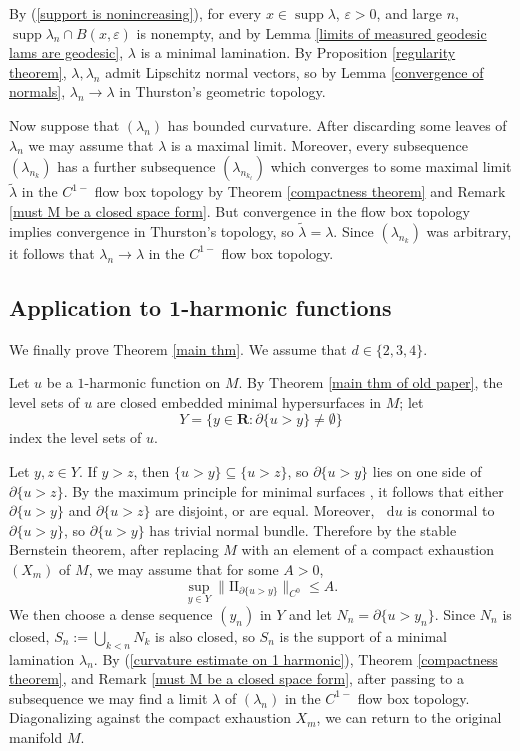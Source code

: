 \documentclass[reqno,11pt]{amsart}
\newcommand{\RR}{\mathbf{R}}
\newcommand*\dif{\mathop{}\!\mathrm{d}}
\DeclareMathOperator{\supp}{supp}
\newcommand{\Two}{\mathrm{I\!I}}
\theoremstyle{definition}
\numberwithin{equation}{section}
\begin{document}
By (\ref{support is nonincreasing}), for every $x \in \supp \lambda$, $\varepsilon > 0$, and large $n$, $\supp \lambda_n \cap B(x, \varepsilon)$ is nonempty, and by Lemma \ref{limits of measured geodesic lams are geodesic}, $\lambda$ is a minimal lamination.
By Proposition \ref{regularity theorem}, $\lambda, \lambda_n$ admit Lipschitz normal vectors, so by Lemma \ref{convergence of normals}, $\lambda_n \to \lambda$ in Thurston's geometric topology.

Now suppose that $(\lambda_n)$ has bounded curvature.
After discarding some leaves of $\lambda_n$ we may assume that $\lambda$ is a maximal limit.
Moreover, every subsequence $(\lambda_{n_k})$ has a further subsequence $(\lambda_{n_{k_\ell}})$ which converges to some maximal limit $\tilde \lambda$ in the $C^{1-}$ flow box topology by Theorem \ref{compactness theorem} and Remark \ref{must M be a closed space form}.
But convergence in the flow box topology implies convergence in Thurston's topology, so $\tilde \lambda = \lambda$.
Since $(\lambda_{n_k})$ was arbitrary, it follows that $\lambda_n \to \lambda$ in the $C^{1-}$ flow box topology.


\subsection{Application to 1-harmonic functions}
We finally prove Theorem \ref{main thm}.
We assume that $d \in \{2, 3, 4\}$.

Let $u$ be a $1$-harmonic function on $M$.
By Theorem \ref{main thm of old paper}, the level sets of $u$ are closed embedded minimal hypersurfaces in $M$; let
$$Y = \{y \in \RR: \partial \{u > y\} \neq \emptyset\}$$
index the level sets of $u$.

Let $y, z \in Y$. If $y > z$, then $\{u > y\} \subseteq \{u > z\}$, so $\partial \{u > y\}$ lies on one side of $\partial \{u > z\}$.
By the maximum principle for minimal surfaces \cite[Corollary 1.28]{colding2011course}, it follows that either $\partial \{u > y\}$ and $\partial \{u > z\}$ are disjoint, or are equal.
Moreover, $\dif u$ is conormal to $\partial \{u > y\}$, so $\partial \{u > y\}$ has trivial normal bundle.
Therefore by the stable Bernstein theorem, after replacing $M$ with an element of a compact exhaustion $(X_m)$ of $M$, we may assume that for some $A > 0$,
\begin{equation}\label{curvature estimate on 1 harmonic}
	\sup_{y \in Y} \|\Two_{\partial \{u > y\}}\|_{C^0} \leq A.
\end{equation}
We then choose a dense sequence $(y_n)$ in $Y$ and let $N_n = \partial \{u > y_n\}$.
Since $N_n$ is closed, $S_n := \bigcup_{k < n} N_k$ is also closed, so $S_n$ is the support of a minimal lamination $\lambda_n$.
By (\ref{curvature estimate on 1 harmonic}), Theorem \ref{compactness theorem}, and Remark \ref{must M be a closed space form}, after passing to a subsequence we may find a limit $\lambda$ of $(\lambda_n)$ in the $C^{1-}$ flow box topology.
Diagonalizing against the compact exhaustion $X_m$, we can return to the original manifold $M$.
\end{document}
